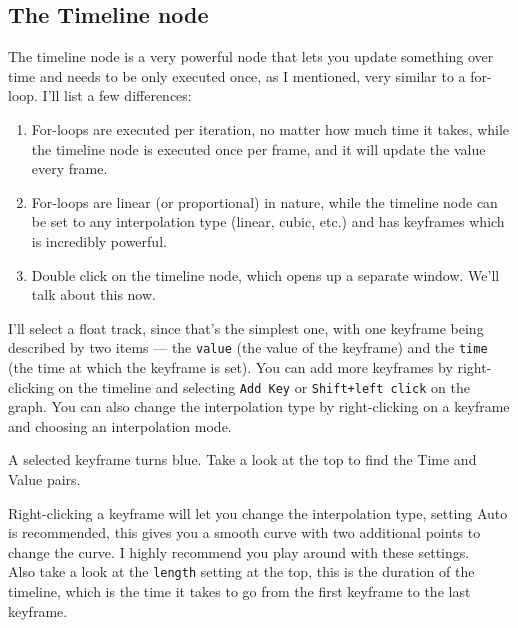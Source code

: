 \documentclass{article}
\begin{document}
\subsection{The Timeline node}
The timeline node is a very powerful node that lets you update something over time and needs to be only executed once, as I mentioned, very similar to a for-loop. I'll list a few differences:

\begin{enumerate}
    \item For-loops are executed per iteration, no matter how much time it takes, while the timeline node is executed once per frame, and it will update the value every frame.
    \item For-loops are linear (or proportional) in nature, while the timeline node can be set to any interpolation type (linear, cubic, etc.) and has keyframes which is incredibly powerful.
    \item Double click on the timeline node, which opens up a separate window. We'll talk about this now.
\end{enumerate}



I'll select a float track, since that's the simplest one, with one keyframe being described by two items --- the \verb|value| (the value of the keyframe) and the \verb|time| (the time at which the keyframe is set). You can add more keyframes by right-clicking on the timeline and selecting \verb|Add Key| or \verb|Shift+left click| on the graph. You can also change the interpolation type by right-clicking on a keyframe and choosing an interpolation mode.

\newpage
A selected keyframe turns blue. Take a look at the top to find the Time and Value pairs.



Right-clicking a keyframe will let you change the interpolation type, setting Auto is recommended, this gives you a smooth curve with two additional points to change the curve. I highly recommend you play around with these settings.\\[10pt]
Also take a look at the \verb|length| setting at the top, this is the duration of the timeline, which is the time it takes to go from the first keyframe to the last keyframe.
\newpage
\end{document}
